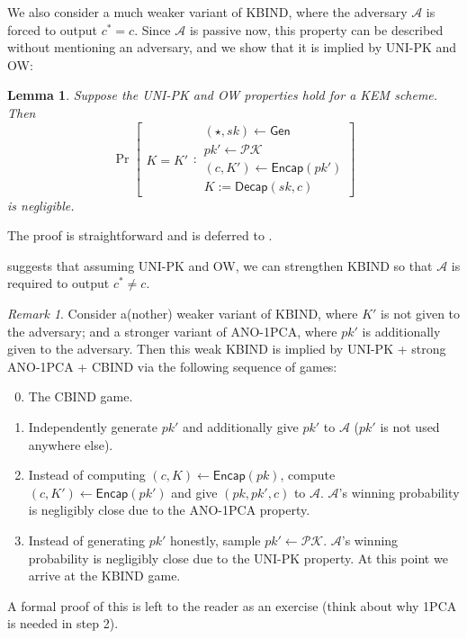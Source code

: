 \documentclass{article}
\theoremstyle{plain}
\newtheorem{lemma}{Lemma}
\theoremstyle{definition}
\theoremstyle{remark}
\newtheorem{remark}{Remark}
\newcommand{\pkspace}{\mathcal{PK}}
\newcommand{\adv}{\mathcal{A}}
\newcommand{\Gen}{\mathsf{Gen}}
\newcommand{\Encap}{\mathsf{Encap}}
\newcommand{\Decap}{\mathsf{Decap}}
\begin{document}
\medskip
We also consider a much weaker variant of KBIND, where the adversary $\adv$ is forced to output $c^* = c$. Since $\adv$ is passive now, this property can be described without mentioning an adversary, and we show that it is implied by UNI-PK and OW:
\begin{lemma}
\label{lem:kbind-eq}
Suppose the UNI-PK and OW properties hold for a KEM scheme. Then
\[
      \operatorname{Pr}
      \left[
      \begin{array}{c}
      K = K'
      \end{array}
      :
      \begin{array}{c}
      (\star,sk) \gets \Gen \\
      pk' \gets \pkspace \\
      (c,K') \gets \Encap(pk') \\
      K := \Decap(sk,c)
      \end{array}
      \right]
\]
is negligible.
\end{lemma}
The proof is straightforward and is deferred to .

 suggests that assuming UNI-PK and OW, we can strengthen KBIND so that $\adv$ is required to output $c^* \neq c$.
\begin{remark}
\label{remark:kbind}
Consider a(nother) weaker variant of KBIND, where $K'$ is not given to the adversary; and a stronger variant of ANO-1PCA, where $pk'$ is additionally given to the adversary. Then this weak KBIND is implied by UNI-PK + strong ANO-1PCA + CBIND via the following sequence of games:
\begin{enumerate}\setcounter{enumi}{-1} 
  \item The CBIND game.
  \item Independently generate $pk'$ and additionally give $pk'$ to $\adv$ ($pk'$ is not used anywhere else).
  \item Instead of computing $(c,K) \gets \Encap(pk)$, compute $(c,K') \gets \Encap(pk')$ and give $(pk,pk',c)$ to $\adv$. $\adv$'s winning probability is negligibly close due to the ANO-1PCA property.
  \item Instead of generating $pk'$ honestly, sample $pk' \gets \pkspace$. $\adv$'s winning probability is negligibly close due to the UNI-PK property. At this point we arrive at the KBIND game.
\end{enumerate}
A formal proof of this is left to the reader as an exercise (think about why 1PCA is needed in step 2).
\end{remark}
\end{document}
